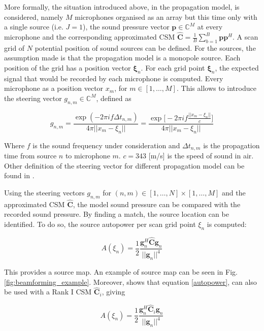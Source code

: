 \documentclass[11pt,a4paper,twoside]{report}
\begin{document}
More formally, the situation introduced above, in the propagation model, is considered, namely $M$ microphones organised as an array but this time only with a single source (i.e. $J = 1$), the sound pressure vector $\mathbf{p} \in \mathbb{C}^M$ at every microphone and the corresponding approximated CSM $\hat{\mathbf{C}} = \frac{1}{B} \sum_{b = 1}^{B} \mathbf{p}\mathbf{p}^H$. A scan grid of $N$ potential position of sound sources can be defined. For the sources, the assumption made is that the propagation model is a monopole source. Each position of the grid has a position vector $\mathbf{\xi}_n$. For each grid point $\mathbf{\xi}_n$, the expected signal that would be recorded by each microphone is computed. Every microphone as a position vector $x_m$, for $m \in [1, \dots, M]$. This allows to introduce the  steering vector $g_{n,m} \in \mathbb{C}^M$, defined as 

\begin{equation}
    g_{n,m} = \frac{\exp(-2 \pi i f \Delta t_{n,m})}{4\pi ||x_m -\xi_n||}
    = \frac{\exp \biggl[ -2 \pi i f \frac{||x_m -\xi_n||}{c} \biggr] }{4\pi ||x_m -\xi_n||}  
\end{equation}


Where $f$ is the sound frequency under consideration and $\Delta t_{n,m}$ is the propagation time from source $n$ to microphone $m$. $c = 343$ [m/s] is the speed of sound in air. Other definition of the steering vector for different propagation model can be found in \cite{sarradj2012three}.

Using the steering vectors $g_{n,m}$ for $(n,m) \in [1, \dots, N] \times [1, \dots, M]$ and the approximated CSM $\hat{\mathbf{C}}$, the model sound pressure can be compared with the recorded sound pressure. By finding a match, the source location can be identified. To do so, the source autopower per scan grid point $\xi_n$ is computed:

\begin{equation}
    \label{autopower}
    A(\xi_n) = \frac{1}{2} \frac{\mathbf{g}_{n}^H \hat{\mathbf{C}} \mathbf{g}_{n}}{||\mathbf{g}_{n}||^4}
\end{equation}

This provides a source map. An example of source map can be seen in Fig. \ref{fig:beamforming_example}. Moreover, \cite{sarradj2010fast} shows that equation \ref{autopower}, can also be used with a Rank I CSM $\hat{\mathbf{C}}_i$, giving

\begin{equation}
    A(\xi_n) = \frac{1}{2} \frac{\mathbf{g}_{n}^H \hat{\mathbf{C}}_i \mathbf{g}_{n}}{||\mathbf{g}_{n}||^4}
\end{equation}
\end{document}
